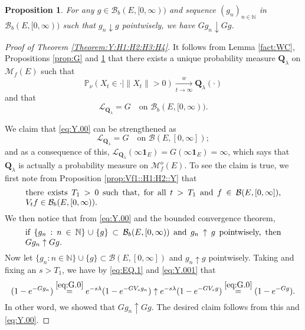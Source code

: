 \documentclass[12pt,a4paper]{amsart}
\numberwithin{equation}{section}
\theoremstyle{plain}
\newtheorem{prop}[thm]{Proposition}
\theoremstyle{definition}
\theoremstyle{remark}
\begin{document}
\begin{prop} \label{prop::GD:H1:H2:H3:H4::Y}
	For any $g\in \mathcal B_b(E,[0,\infty))$ and
	sequence $(g_n)_{n\in \mathbb N}$ in $\mathcal B_b(E,[0,\infty))$
	such that $g_n \downarrow g$ pointwisely,
	we have $G g_n \downarrow Gg$.
\end{prop}

\begin{proof}[Proof of Theorem \ref{Theorem:Y:H1:H2:H3:H4}]
	It follows from Lemma \ref{fact:WC}, Propositions \ref{prop:G} and \ref{prop::GD:H1:H2:H3:H4::Y} that there exists a unique probability measure $\mathbf Q_\lambda$ on $\mathcal M_f(E)$ such that
\begin{equation}\label{eq:Y.0}
 	\mathbb P_{\nu}(X_t \in \cdot | \|X_t\|>0 )
	\xrightarrow[t\to \infty]{w} \mathbf Q_\lambda(\cdot)
\end{equation}
	and that
\begin{equation} \label{eq:Y.00}
	\mathscr L_{\mathbf Q_\lambda} = G \quad \mbox{on } \mathcal B_b(E,[0,\infty)).
\end{equation}


	We claim that \eqref{eq:Y.00} can be strengthened as
\begin{equation} \label{eq:Y.000}
	\mathscr L_{\mathbf Q_\lambda}
	= G \quad \mbox{on } \mathcal B(E,[0,\infty]);
\end{equation}
	and as a consequence of this, $\mathscr L_{\mathbf Q_\lambda}(\infty \mathbf 1_E) = G(\infty \mathbf 1_E)= \infty$, which says that $\mathbf Q_\lambda$ is actually a probability measure on $\mathcal M_f^o(E)$.
	To see the claim is true, we first note from Proposition \ref{prop:Vf1::H1:H2::Y} that
\begin{equation} \label{eq:EQ.1} \begin{minipage}{0.9\textwidth}
	there exists $T_1>0$ such that, for all $t>T_1$ and $f\in \mathcal B(E,[0,\infty])$, $V_tf \in \mathcal B_b(E,[0,\infty))$.
\end{minipage} \end{equation}
	 We then notice that from \eqref{eq:Y.00} and the bounded convergence theorem,
\begin{equation} \label{eq:Y.001}
\begin{minipage}{0.9\textwidth}
	if $\{g_n:n\in \mathbb N\} \cup \{g\} \subset \mathcal B_b(E,[0,\infty))$ and $g_n \uparrow g$ pointwisely, then $Gg_n \uparrow Gg$.
\end{minipage}
\end{equation}
	Now let $\{g_n:n\in \mathbb N\} \cup \{g\} \subset \mathcal B(E,[0,\infty])$ and $g_n \uparrow g$ pointwisely.
	Taking and fixing an $s > T_1$, we have by \eqref{eq:EQ.1} and \eqref{eq:Y.001} that
\[
	(1 - e^{-G g_n})
	\overset{\eqref{eq:G.0}} = e^{- s\lambda } (1 - e^{- G V_s g_n})
	\uparrow e^{- s\lambda } (1 - e^{- G V_s g})
	\overset{\eqref{eq:G.0}} =(1 - e^{-G g}).
\]
	In other word, we showed that $Gg_n \uparrow Gg$.
	The desired claim follows from this and \eqref{eq:Y.00}.



\end{proof}
\end{document}
